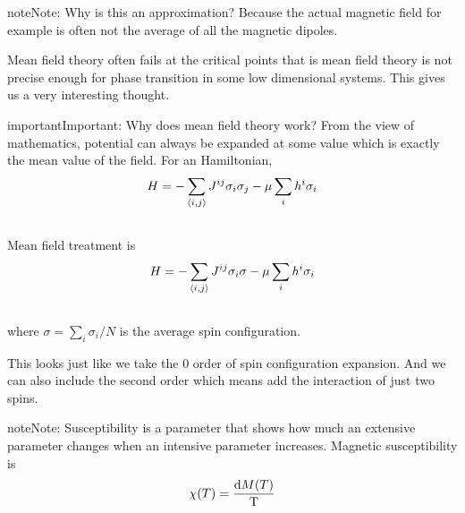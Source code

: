 \documentclass[letterpaper,10pt,english]{sphinxmanual}
\begin{document}
\begin{notice}{note}{Note:}
Why is this an approximation?
Because the actual magnetic field for example is often not the average of all the magnetic dipoles.
\end{notice}

Mean field theory often fails at the critical points that is mean field theory is not precise enough for phase transition in some low dimensional systems. This gives us a very interesting thought.

\begin{notice}{important}{Important:}
Why does mean field theory work? From the view of mathematics, potential can always be expanded at some value which is exactly the mean value of the field. For an Hamiltonian,
\begin{gather}
\begin{split}H = - \sum _{\langle i,j \rangle} J^{ij} \sigma_i \sigma_j - \mu \sum_i h^i \sigma_i\end{split}\notag\\\begin{split}\end{split}\notag
\end{gather}
Mean field treatment is
\begin{gather}
\begin{split}H = - \sum _{\langle i,j \rangle} J^{ij} \sigma_i \sigma - \mu \sum_i h^i \sigma_i\end{split}\notag\\\begin{split}\end{split}\notag
\end{gather}
where $\sigma = \sum_i \sigma_i/N$ is the average spin configuration.

This looks just like we take the 0 order of spin configuration expansion. And we can also include the second order which means add the interaction of just two spins.
\end{notice}

\begin{notice}{note}{Note:}
Susceptibility is a parameter that shows how much an extensive parameter changes when an intensive parameter increases. Magnetic susceptibility is
\begin{gather}
\begin{split}\chi(T)= \frac{\mathrm d M(T)}{\mathrm T}\end{split}\notag\\\begin{split}\end{split}\notag
\end{gather}\end{notice}
\end{document}
